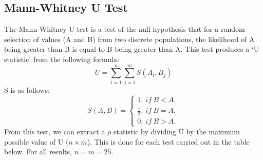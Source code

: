 	\subsection{Mann-Whitney U Test}  
		\label{sec:comparison_mann-whitney} 
		The Mann-Whitney U test is a test of the null hypothesis that for a random selection of values (A and B) from two discrete populations, the likelihood of A being greater than B is equal to B being greater than A. This test produces a `U statistic' from the following formula:
		\begin{equation}
			U = \sum\limits_{i=1}^n\sum\limits_{j=1}^m S(A_i, B_j)
		\end{equation}
		S is as follows:
		\begin{equation}
			S(A, B) = 
			\begin{cases}
				1, \:if\: B < A, \\
				\frac{1}{2}, \:if\: B = A, \\
				0, \:if\: B > A.
			\end{cases}
		\end{equation}
		From this test, we can extract a $\rho$ statistic by dividing U by the maximum possible value of U ($n \times m$). This is done for each test carried out in the table below. For all results, $n = m = 25$. \\
		\begin{center}
			\small
		\end{center}
